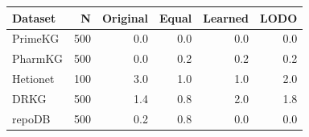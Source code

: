 \begin{tabular}{lrrrrr}
\hline
Dataset & N & Original & Equal & Learned & LODO \\
\hline
PrimeKG & 500 & 0.0 & 0.0 & 0.0 & 0.0 \\
PharmKG & 500 & 0.0 & 0.2 & 0.2 & 0.2 \\
Hetionet & 100 & 3.0 & 1.0 & 1.0 & 2.0 \\
DRKG & 500 & 1.4 & 0.8 & 2.0 & 1.8 \\
repoDB & 500 & 0.2 & 0.8 & 0.0 & 0.0 \\
\hline
\end{tabular}